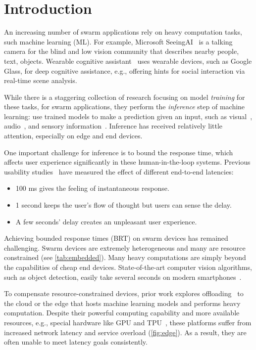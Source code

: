 \section{Introduction}
\label{sec:introduction}

An increasing number of swarm applications rely on heavy computation tasks, such
machine learning (ML). For example, Microsoft SeeingAI~\cite{seeingai} is a
talking camera for the blind and low vision community that describes nearby
people, text, objects. Wearable cognitive assistant~\cite{ha2014towards} uses
wearable devices, such as Google Glass, for deep cognitive assistance, e.g.,
offering hints for social interaction via real-time scene analysis.

While there is a staggering collection of research focusing on model
\textit{training} for these tasks, for swarm applications, they perform the
\textit{inference} step of machine learning: use trained models to make a
prediction given an input, such as visual~\cite{googlelens, ha2014towards,
  seeingai}, audio~\cite{alexa, applesiri, cortana}, and sensory
information~\cite{laput2017synthetic, lu2010jigsaw}. Inference has received
relatively little attention, especially on edge and end devices.

One important challenge for inference is to bound the response time, which
affects user experience significantly in these human-in-the-loop
systems. Previous usability studies~\cite{nielsen1994usability,
  schneiderman1998designing} have measured the effect of different end-to-end
latencies:

\begin{itemize}[noitemsep, topsep=5pt]
\item 100 ms gives the feeling of instantaneous response.
\item 1 second keeps the user's flow of thought but users can sense the delay.
\item A few seconds' delay creates an unpleasant user experience.
\end{itemize}

Achieving bounded response times (BRT) on swarm devices has remained
challenging. Swarm devices are extremely heterogeneous and many are resource
constrained (see \autoref{tab:embedded}). Many heavy computations are simply
beyond the capabilities of cheap end devices. State-of-the-art computer vision
algorithms, such as object detection, easily take several seconds on modern
smartphones~\cite{chen2015glimpse}.

To compensate resource-constrained devices, prior work explores
offloading~\cite{chun2011clonecloud,cuervo2010maui} to the cloud or the edge
that hosts machine learning models and performs heavy computation. Despite their
powerful computing capability and more available resources, e.g., special
hardware like GPU and TPU~\cite{jouppi2017datacenter}, these platforms suffer
from increased network latency and service overload (\autoref{fig:edge}). As a
result, they are often unable to meet latency goals consistently.

